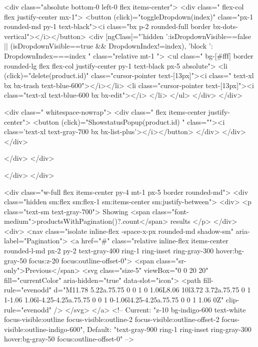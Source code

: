     <div class="absolute bottom-0 left-0 flex items-center">
        <div class=" flex-col flex justify-center mx-1">
            <button (click)="toggleDropdown(index)"
                class="px-1 rounded-md py-1  text-black"><i
                    class="bx p-2 rounded-full border bx-dots-vertical"></i></button>
            <div [ngClass]="{'hidden ':isDropdownVisible==false || (isDropdownVisible==true && DropdownIndex!=index),
       'block ': DropdownIndex===index
       }" class="relative mt-1 ">
                <ul
                    class=" bg-[#fff] border rounded-lg flex flex-col justify-center py-1  text-black px-5 absolute">
                    <li (click)="delete(product.id)" class="cursor-pointer text-[13px]"><i
                            class=" text-xl bx bx-trash text-blue-600"></i></li>
                    <li class="cursor-pointer text-[13px]"><i
                            class="text-xl text-blue-600 bx bx-edit"></i>
                    </li>
                </ul>
            </div>
        </div>

        <div class=" whitespace-nowrap">
            <div class=" flex items-center justify-center">
                <button (click)="ShowstatusPopup(product.id) " class=""><i
                        class='text-xl  text-gray-700 bx bx-list-plus'></i></button>
            </div>
        </div>
    </div>

    </div>
   </div> 
           
</div>
</div>

<div class="w-full flex items-center py-4 mt-1 px-5 border rounded-md">
    <div class="hidden sm:flex sm:flex-1 sm:items-center sm:justify-between">
        <div>
            <p class="text-sm text-gray-700">
                Showing
                <span class="font-medium">{{productsWithPagination()?.count}}</span>
                results
            </p>
        </div>
        <div>
            <nav class="isolate inline-flex -space-x-px rounded-md shadow-sm"
                aria-label="Pagination">
                <a href="#"
                    class="relative inline-flex items-center rounded-l-md px-2 py-2 text-gray-400 ring-1 ring-inset ring-gray-300 hover:bg-gray-50 focus:z-20 focus:outline-offset-0">
                    <span class="sr-only">Previous</span>
                    <svg class="size-5" viewBox="0 0 20 20" fill="currentColor" aria-hidden="true"
                        data-slot="icon">
                        <path fill-rule="evenodd"
                            d="M11.78 5.22a.75.75 0 0 1 0 1.06L8.06 10l3.72 3.72a.75.75 0 1 1-1.06 1.06l-4.25-4.25a.75.75 0 0 1 0-1.06l4.25-4.25a.75.75 0 0 1 1.06 0Z"
                            clip-rule="evenodd" />
                    </svg>
                </a>
                <!-- Current: "z-10 bg-indigo-600 text-white focus-visible:outline focus-visible:outline-2 focus-visible:outline-offset-2 focus-visible:outline-indigo-600", Default: "text-gray-900 ring-1 ring-inset ring-gray-300 hover:bg-gray-50 focus:outline-offset-0" -->


